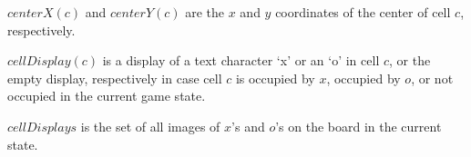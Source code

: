 \documentclass{led_doc}
\begin{document}
\begin{ledDef}
\end{ledDef}

\begin{ledCmnt}
$centerX(c)$ and $centerY(c)$ are the $x$ and $y$ coordinates of the center of cell $c$, respectively.
\end{ledCmnt}

\begin{ledDef}
\end{ledDef}

\begin{ledDef}
\end{ledDef}

\begin{ledCmnt}
$cellDisplay(c)$ is a display of a text character `x' or an `o' in cell $c$,
or the empty display, respectively in case cell $c$ is occupied by $x$, occupied
by $o$, or not occupied in the current game state.
\end{ledCmnt}

\begin{ledDef}
\end{ledDef}

\begin{ledDef}
\end{ledDef}

\begin{ledDef}
\end{ledDef}

\begin{ledCmnt}
$cellDisplays$ is the set of all images of $x$'s and $o$'s on the board in the current state.
\end{ledCmnt}
\end{document}
